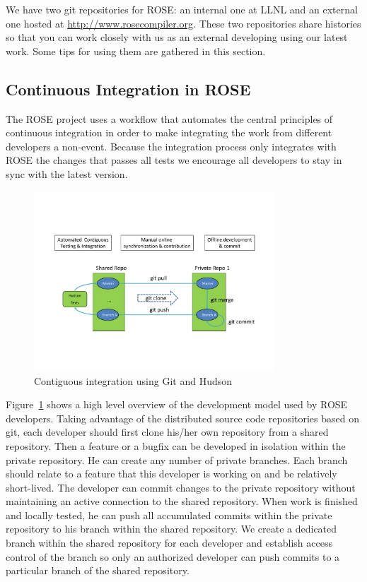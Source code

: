 We have two git repositories for ROSE: an internal one at LLNL and an external
one hosted at \url{http://www.rosecompiler.org}. These two repositories share histories so that
you can work closely with us as an external developing using our latest work. 
Some tips for using them are gathered in this section.


\subsection{Continuous Integration in ROSE}

The ROSE project uses a workflow that automates the central principles of
continuous integration in order to make integrating the work from different
developers a non-event. Because the integration process only integrates
with ROSE the changes that passes all tests we encourage all developers
to stay in sync with the latest version.

\begin{figure}[htbp]  
  \centering
    \includegraphics[width=0.8\textwidth]{rose-git-hudson.pdf}
  \caption{Contiguous integration using Git and Hudson}
  \label{fig:rose-git-hudson}
\end{figure}

Figure~\ref{fig:rose-git-hudson} shows a high level overview of the development model used by 
ROSE developers. Taking advantage of the distributed source code repositories based on git, 
each developer should first clone his/her own repository from a shared repository.
Then a feature or a bugfix can be developed in isolation within the private repository.
He can create any number of private branches. Each branch should relate to a
feature that this developer is working on and be relatively short-lived. 
The developer can commit changes to the private repository without
maintaining an active connection to 
the shared repository.  When work is finished and locally tested, he can push all accumulated commits within the private repository 
to his branch within the shared repository. 
We create a dedicated branch within the shared repository for each developer and establish access control of the
branch so only an authorized developer can push commits to a particular branch of the shared repository. 

